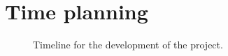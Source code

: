\section{Time planning}
\label{sec:time-planning}

\begin{figure}[H]
  \centering
  \caption{Timeline for the development of the project.}
  \label{fig:project-timeline}
\end{figure}

